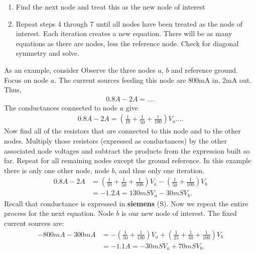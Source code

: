 \documentclass{report}
\begin{document}
\begin{itemize}
\begin{enumerate}
                 \item Find the next node and treat this as the new node of interest
                 \item Repeat steps 4 through 7 until all nodes have been treated as the node of interest. Each iteration creates a new equation. There will be as many equations as there are nodes, less the reference node. Check for diagonal symmetry and solve.
             \end{enumerate}
             As an example, consider
             \bigbreak \noindent 
             \bigbreak \noindent 
             Observe the three nodes $a$, $b$ and reference ground. Focus on node $a$. The current sources feeding this node are 800mA in, 2mA out. Thus,
             \begin{align*}
                 0.8A - 2A = ...
             .\end{align*}
             The conductances connected to node $a$ give
             \begin{align*}
                 0.8A - 2A = \left(\frac{1}{10} + \frac{1}{50} + \frac{1}{100}\right) V_{a}...
             .\end{align*}
             Now find all of the resistors that are connected to this node and to the other nodes. Multiply those resistors (expressed as conductances) by the other associated node voltages and subtract the products from the expression built so far. Repeat for all remaining nodes except the ground reference. In this example there is only one other node, node $b$, and thus only one iteration.
             \begin{align*}
                 0.8A - 2A &= \left(\frac{1}{10} + \frac{1}{50} + \frac{1}{100}\right) V_{a} - \left(\frac{1}{50} + \frac{1}{100}\right) V_{b} \\
                  &= -1.2A = 130mSV_{a} - 30mSV_{b}
             .\end{align*}
             Recall that conductance is expressed in \textbf{siemens} (S).
             \bigbreak \noindent 
             Now we repeat the entire process for the next equation. Node $b$ is our new node of interest. The fixed current sources are:
             \begin{align*}
                 -800mA - 300mA &= -\left(\frac{1}{50} + \frac{1}{100}\right)V_{a} + \left(\frac{1}{25} + \frac{1}{50} + \frac{1}{100}\right)V_{b} \\
                                &= -1.1A = -30mSV_{a} + 70mSV_{b}
             .\end{align*}

\end{itemize}
\end{document}
